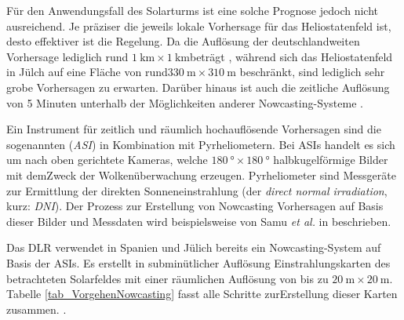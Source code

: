 Für den Anwendungsfall des Solarturms ist eine solche Prognose jedoch nicht ausreichend.
Je präziser die jeweils lokale Vorhersage für das Heliostatenfeld ist, desto effektiver ist die Regelung.
Da die Auflösung der deutschlandweiten Vorhersage lediglich rund $\SI{1}{\kilo\metre} \times \SI{1}{\kilo\metre}$\linebreak beträgt \cite{DWD1}\cite{DWD2}, während sich das Heliostatenfeld in Jülch auf eine Fläche von rund\linebreak $\SI{330}{\metre} \times \SI{310}{\metre}$ beschränkt, sind lediglich sehr grobe Vorhersagen zu erwarten.
Darüber hinaus ist auch die zeitliche Auflösung von 5 Minuten \cite{DWD2} unterhalb der Möglichkeiten anderer Nowcasting-Systeme \cite{DLRNowcasting}\cite[S.272]{QuesadaRuiz}.

Ein Instrument für zeitlich und räumlich hochauflösende Vorhersagen sind die sogenannten  (\textit{ASI}) in Kombination mit Pyrheliometern.
Bei ASIs handelt es sich um nach oben gerichtete Kameras, welche $\SI{180}{\degree} \times \SI{180}{\degree}$ halbkugelförmige Bilder mit dem\linebreak Zweck der Wolkenüberwachung erzeugen.
Pyrheliometer sind Messgeräte zur Ermittlung der direkten Sonneneinstrahlung (der \textit{direct normal irradiation}, kurz: \textit{DNI}).
Der Prozess zur Erstellung von Nowcasting Vorhersagen auf Basis dieser Bilder und Messdaten wird beispielsweise von Samu \textit{et al.} in \cite{Samu} beschrieben.

Das DLR verwendet in Spanien und Jülich bereits ein Nowcasting-System auf Basis der ASIs.
Es erstellt in subminütlicher Auflösung Einstrahlungskarten des betrachteten Solarfeldes mit einer räumlichen Auflösung von bis zu $\SI{20}{\metre} \times \SI{20}{\metre}$.
Tabelle \ref{tab_VorgehenNowcasting} fasst alle Schritte zur\linebreak Erstellung dieser Karten zusammen. \cite[S.4,S.13]{Samu}\cite{DLRNowcasting}.


